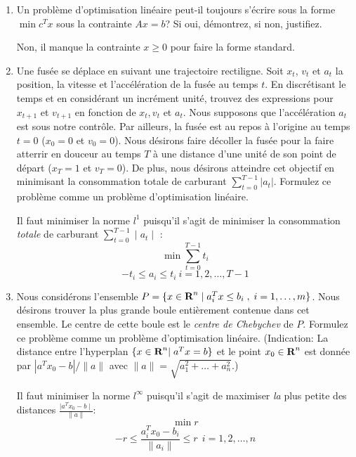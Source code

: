 \begin{enumerate}
  \item Un problème d'optimisation linéaire peut-il toujours s'écrire sous la forme $\min c^Tx$ sous la contrainte $Ax = b$? Si oui, démontrez, si non, justifiez.

    \begin{solution}
      Non, il manque la contrainte $x \geq 0$ pour faire la forme standard.

    \end{solution}

  \item Une fusée se déplace en suivant une trajectoire rectiligne. Soit $x_t$, $v_t$
    et $a_t$ la position, la vitesse et l'accélération de la fusée au temps $t$. En discrétisant le temps et en considérant un incrément
    unité, trouvez des expressions pour $x_{t+1}$ et $v_{t+1}$ en fonction de $x_t, v_t$ et $a_t$. Nous supposons que l'accélération $a_t$ est sous notre
    contrôle. Par ailleurs, la fusée est au repos à l'origine au temps
    $t=0$ ($x_0=0$ et
    $v_0=0$). Nous désirons faire décoller la fusée pour la faire atterrir  en douceur au temps $T$ à une
    distance d'une unité de son point de départ ($x_T=1$ et $v_T=0$). De plus, nous désirons atteindre cet
    objectif en minimisant la consommation totale de carburant
    $\sum_{t=0}^{T-1} |a_t|$.  Formulez ce problème comme un problème d'optimisation linéaire.

    \begin{solution}
      Il faut minimiser la norme $l^{1}$ puisqu'il s'agit de minimiser la consommation \textit{totale} de carburant $\sum_{t=0}^{T-1} \mid a_{t} \mid$ : 
      $$\min \sum_{t=0}^{T-1} t_{i}$$
      $$-t_{i} \le a_{i} \le t_{i}~ i = 1,2,\dots,T-1$$
    \end{solution}



  \item Nous considérons l'ensemble $P=\{ x \in {\mbox{\bf R}}^n \; | \; a_i^T x \leq b_i \; , \;  i=1, \ldots, m \}$. Nous désirons trouver la
    plus grande boule entièrement contenue dans cet ensemble. Le centre de cette boule est  le {\it centre de Chebychev} de $P$.  Formulez
    ce problème comme un problème d'optimisation linéaire. (Indication:  La distance entre l'hyperplan $\{x \in {\mbox{\bf R}}^n | \;  a^Tx=b \}$ et le point $x_0 \in {\mbox{\bf R}}^n$
    est donnée par
    $|a^Tx_0 - b|/\|a\|$ avec $\|a\|=\sqrt{a_1^2+ \ldots + a_n^2}$.)

    \begin{solution}
      Il faut minimiser la norme $l^{\infty}$ puisqu'il s'agit de maximiser \textit{la} plus petite des distances $\frac{\mid a^{T}x_{0} - b \mid}{\|a\|}$: 
      $$ \min r$$
      $$-r \le \frac{a_{i}^{T}x_{0} - b_{i}}{\|a_{i}\|} \le r ~~i = 1,2, \dots, n$$
    \end{solution}






\end{enumerate}
